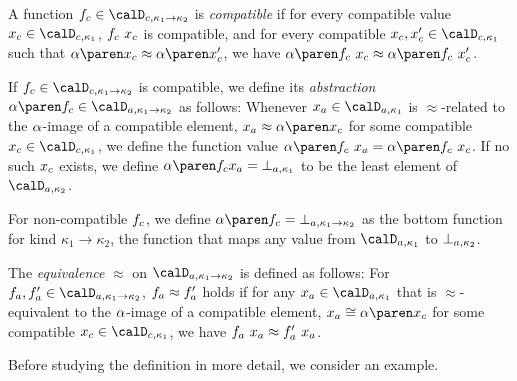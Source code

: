\documentclass[../../diss.tex]{subfiles}
\begin{document}
\begin{definition}%
\label{Definition:HORSEFPTBasics}%
    \begin{thmenumerate}[(1)]%
        \item
            A function $\fc \in \domainc{\kappa_1 \to \kappa_2}$ is \emph{compatible} if for every compatible value $\xc \in \domainc{\kappa_1}$, $f_c \  x_c$ is compatible, and
                for every compatible $\xc, \xc' \in \domainc{\kappa_1}$ such that $\abs{\xc} \approx \abs{\xc'}$, we have $\abs{\fc \appl \xc} \approx \abs{\fc \appl \xc'}$.
        \item
            If $\fc  \in \domainc{\kappa_1 \to \kappa_2}$ is compatible, we define its \emph{abstraction} $\abs{\fc} \in \domaina{\kappa_1 \to \kappa_2}$ as follows:
            Whenever $\xa \in \domaina{\kappa_1}$ is $\approx$-related to the $\abs$-image of a compatible element, \ie $\xa \approx \abs{\xc}$ for some compatible $\xc \in \domainc{\kappa_1}$, we define the function value $\abs{\fc} \appl \xa = \abs{\fc \appl \xc}$.
            If no such $x_c$ exists, we define $\abs{\fc} \xa = \bota{\kappa_1}$ to be the least element of $\domaina{\kappa_2}$.

            For non-compatible $f_c$, we define $\abs{\fc} = \bota{\kappa_1 \to \kappa_2}$ as the bottom function for kind $\kappa_1 \to \kappa_2$, the function that maps any value from $\domaina{\kappa_1}$ to $\bota{\kappa_2}$.
        \item
            The \emph{equivalence} $\approx$ on $\domaina{\kappa_1 \to \kappa_2}$ is defined as follows: For $\fa, \fa' \in \domaina{\kappa_1 \to \kappa_2}$, $f_a \approx f_a'$ holds if for any $\xa \in \domaina{\kappa_1}$ that is $\approx$-equivalent to the $\abs$-image of a compatible element, $\xa \cong \abs{\xc}$ for some compatible $\xc \in \domainc{\kappa_1}$, we have $f_a \  x_a \approx f_a' \  x_a$.
    \end{thmenumerate}
\end{definition}

Before studying the definition in more detail, we consider an example.
\end{document}
